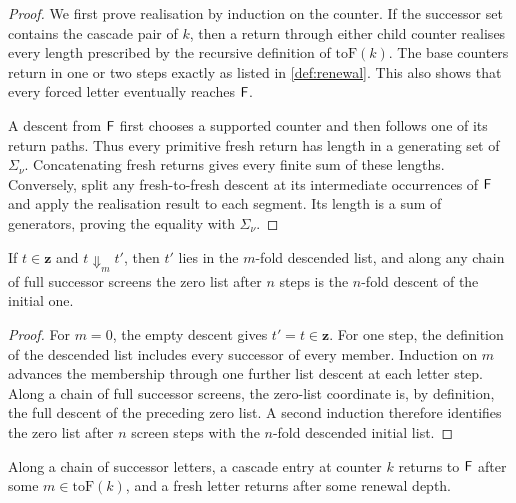\begin{proof}
\leanok
{}
We first prove realisation by induction on the counter. If the successor set contains the cascade
pair of $k$, then a return through either child counter realises every length prescribed by the
recursive definition of $\mathrm{toF}(k)$. The base counters return in one or two steps exactly as
listed in \cref{def:renewal}. This also shows that every forced letter eventually reaches $\mathsf{F}$.

A descent from $\mathsf{F}$ first chooses a supported counter and then follows one of its return paths.
Thus every primitive fresh return has length in a generating set of $\Sigma_\nu$. Concatenating
fresh returns gives every finite sum of these lengths. Conversely, split any fresh-to-fresh descent
at its intermediate occurrences of $\mathsf{F}$ and apply the realisation result to each segment. Its
length is a sum of generators, proving the equality with $\Sigma_\nu$.
\end{proof}

\begin{lemma}
\label{thm:coverage}
\leanok
{}
If $t\in\boldsymbol z$ and $t\Downarrow_mt'$, then $t'$ lies in the $m$-fold descended list, and
along any chain of full successor screens the zero list after $n$ steps is the $n$-fold descent
of the initial one.
\end{lemma}

\begin{proof}
\leanok
{}
For $m=0$, the empty descent gives $t'=t\in\boldsymbol z$. For one step, the definition of the
descended list includes every successor of every member. Induction on $m$ advances the membership
through one further list descent at each letter step. Along a chain of full successor screens, the
zero-list coordinate is, by definition, the full descent of the preceding zero list. A second
induction therefore identifies the zero list after $n$ screen steps with the $n$-fold descended
initial list.
\end{proof}

\begin{lemma}
\label{thm:source-ray}
\leanok
Along a chain of successor letters, a cascade entry at counter $k$ returns to $\mathsf{F}$ after some
$m\in\mathrm{toF}(k)$, and a fresh letter returns after some renewal depth.
\end{lemma}

